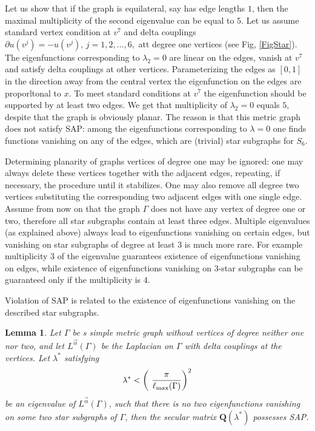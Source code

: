 \documentclass{amsart}
\newtheorem{lemma}[theorem]{Lemma}
\theoremstyle{definition}
\theoremstyle{remark}
\numberwithin{equation}{section}
\begin{document}
Let us show that if the graph is equilateral, say has  edge lengths $1$, then the maximal multiplicity of the second eigenvalue
can be equal to $5$.  Let us assume standard vertex condition
at $ v^7 $ and  delta couplings $ \partial u (v^j) = -  u (v^j), \, j =1,2, \dots, 6, $ att degree one vertices (see Fig, \ref{FigStar}).
The eigenfunctions corresponding to $ \lambda_2 = 0 $ are  linear on the edges, vanish
at $ v^7$ and satisfy delta couplings at other vertices.
Parameterizing the edges as $[0,1]$ in the direction away from the central vertex  the eigenfunction on the edges are proporltonal to   $ x$.
To meet standard conditions at $ v^7 $ the eigenfunction should be supported
by at least two edges. We get that  multiplicity of $ \lambda_2 = 0 $ equals $5$, despite that the graph is obviously planar.
The reason is that this metric graph does not satisfy SAP:  among the eigenfunctions corresponding to $ \lambda  = 0 $
one finds functions vanishing on any of the edges, which are (trivial) star subgraphs for $ S_6$.


Determining planarity of graphs vertices of degree one may be ignored: one may always delete these
vertices together with the adjacent edges, repeating, if necessary, the procedure until it stabilizes. One may also remove all degree
two vertices substituting the corresponding two adjacent edges with one single edge.
Assume  from now on that
the graph $ \Gamma $ does not have any  vertex of degree one or two,  therefore all star subgraphs contain at 
least three edges. Multiple eigenvalues (as explained above) always lead to eigenfunctions vanishing on certain edges,
but vanishing on star subgraphs of degree at least $3$ is much more rare.
For example multiplicity $3$ of the eigenvalue guarantees existence of eigenfunctions vanishing on edges, while
existence of eigenfunctions vanishing on $3$-star subgraphs can be guaranteed only if the multiplicity is $4$.




Violation of SAP is related to the existence of eigenfunctions vanishing on the described star subgraphs.

\begin{lemma}  \label{Lemma42}
Let $ \Gamma $ be s simple metric graph without vertices of degree neither one nor two, and
let $ L^{\vec{\alpha}}(\Gamma) $ be the Laplacian on $ \Gamma $ with delta couplings
at the vertices. Let $ \lambda^*$ satisfying
\begin{equation} \label{lest}
 \lambda^* < \left( \frac{\pi}{\ell_{\rm max} (\Gamma)} \right)^2 
 \end{equation}
  be an eigenvalue of $ L^{\vec{\alpha}}(\Gamma) $,
such that there is no two eigenfunctions vanishing on some two star subgraphs of $ \Gamma $, 
then the secular matrix $ \mathbf Q(\lambda^*) $ possesses SAP.
\end{lemma}
\end{document}
